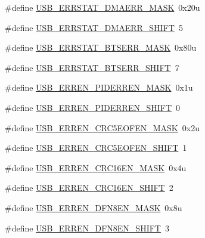\begin{DoxyCompactItemize}
\item 
\#define \hyperlink{group___u_s_b___register___masks_ga3941bf3fbbca724b3b26a09bb2432581}{U\+S\+B\+\_\+\+E\+R\+R\+S\+T\+A\+T\+\_\+\+D\+M\+A\+E\+R\+R\+\_\+\+M\+A\+SK}~0x20u
\item 
\#define \hyperlink{group___u_s_b___register___masks_ga2e3f280874ee203f1f801206ab4254be}{U\+S\+B\+\_\+\+E\+R\+R\+S\+T\+A\+T\+\_\+\+D\+M\+A\+E\+R\+R\+\_\+\+S\+H\+I\+FT}~5
\item 
\#define \hyperlink{group___u_s_b___register___masks_ga9cfa1a07c56005e5d545ecf363c4e916}{U\+S\+B\+\_\+\+E\+R\+R\+S\+T\+A\+T\+\_\+\+B\+T\+S\+E\+R\+R\+\_\+\+M\+A\+SK}~0x80u
\item 
\#define \hyperlink{group___u_s_b___register___masks_ga4827905bfe176b3ba2992ce3ff9a4575}{U\+S\+B\+\_\+\+E\+R\+R\+S\+T\+A\+T\+\_\+\+B\+T\+S\+E\+R\+R\+\_\+\+S\+H\+I\+FT}~7
\item 
\#define \hyperlink{group___u_s_b___register___masks_ga971e0d8939196ec3990a73b4db4030ad}{U\+S\+B\+\_\+\+E\+R\+R\+E\+N\+\_\+\+P\+I\+D\+E\+R\+R\+E\+N\+\_\+\+M\+A\+SK}~0x1u
\item 
\#define \hyperlink{group___u_s_b___register___masks_ga47a2a895b1b94a32aa482d11173e2fb9}{U\+S\+B\+\_\+\+E\+R\+R\+E\+N\+\_\+\+P\+I\+D\+E\+R\+R\+E\+N\+\_\+\+S\+H\+I\+FT}~0
\item 
\#define \hyperlink{group___u_s_b___register___masks_gafab72bb1aedf0d529c720a25d6ee93da}{U\+S\+B\+\_\+\+E\+R\+R\+E\+N\+\_\+\+C\+R\+C5\+E\+O\+F\+E\+N\+\_\+\+M\+A\+SK}~0x2u
\item 
\#define \hyperlink{group___u_s_b___register___masks_gafc8288624f2373be283f408a290f3daf}{U\+S\+B\+\_\+\+E\+R\+R\+E\+N\+\_\+\+C\+R\+C5\+E\+O\+F\+E\+N\+\_\+\+S\+H\+I\+FT}~1
\item 
\#define \hyperlink{group___u_s_b___register___masks_gae216c42729f6b3d992001136744fe341}{U\+S\+B\+\_\+\+E\+R\+R\+E\+N\+\_\+\+C\+R\+C16\+E\+N\+\_\+\+M\+A\+SK}~0x4u
\item 
\#define \hyperlink{group___u_s_b___register___masks_ga7d910c7016807387969de45f0ac3e2d6}{U\+S\+B\+\_\+\+E\+R\+R\+E\+N\+\_\+\+C\+R\+C16\+E\+N\+\_\+\+S\+H\+I\+FT}~2
\item 
\#define \hyperlink{group___u_s_b___register___masks_ga4077d6e25312cdf05ef982907720c2f6}{U\+S\+B\+\_\+\+E\+R\+R\+E\+N\+\_\+\+D\+F\+N8\+E\+N\+\_\+\+M\+A\+SK}~0x8u
\item 
\#define \hyperlink{group___u_s_b___register___masks_ga25ff64c64f5871c1c278c5639d862ba7}{U\+S\+B\+\_\+\+E\+R\+R\+E\+N\+\_\+\+D\+F\+N8\+E\+N\+\_\+\+S\+H\+I\+FT}~3
\item 

\end{DoxyCompactItemize}

